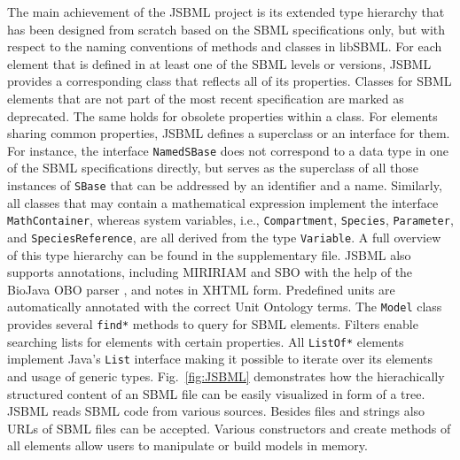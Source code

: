 \documentclass{bioinfo}
\begin{document}
\begin{methods}
The main achievement of the JSBML project is its extended type hierarchy that has been designed 
from scratch based on the SBML specifications only, but with respect to the naming conventions of
methods and classes in libSBML. For each element that is defined in at least one of the SBML levels 
or versions, JSBML provides a corresponding
class that reflects all of its properties. Classes for 
SBML elements that are not part of the most 
recent specification are marked as deprecated. The same holds for obsolete properties within 
a class. For elements sharing common properties, JSBML defines a 
superclass or an interface for them. For instance, the interface \texttt{NamedSBase} does
not correspond to a data type in one of the SBML specifications directly, but serves as the
superclass of all those instances of \texttt{SBase} that can be addressed by an identifier and
a name. Similarly, all classes that may contain a mathematical expression implement the 
interface \texttt{MathContainer}, whereas system variables, i.e., \texttt{Compartment}, 
\texttt{Species}, \texttt{Parameter}, and \texttt{SpeciesReference}, are all derived from the 
type \texttt{Variable}. A full overview of this type hierarchy can be found in the supplementary
file. JSBML also supports annotations, including MIRIRIAM \citep{Novere2005} and SBO \citep{Novere2006b} 
with the help of the BioJava OBO parser \citep{Holland2008}, and notes in XHTML form. Predefined units are automatically
annotated with the correct Unit Ontology terms.
The \texttt{Model} class provides several \texttt{find*} methods to query for SBML elements.
Filters enable searching lists for elements with certain properties. 
All \texttt{ListOf*} elements implement Java's \texttt{List} interface making it 
possible to iterate over its elements and usage of generic types.
Fig.~\ref{fig:JSBML} demonstrates how the hierachically structured content of an SBML file 
can be easily visualized in form of a tree. JSBML reads SBML code from various sources. Besides
files and strings also URLs of SBML files can be accepted. Various constructors and create methods
of all elements allow users to manipulate or build models in memory.
\begin{figure}
\centerline{
  }
\end{figure}
\end{methods}
\end{document}
